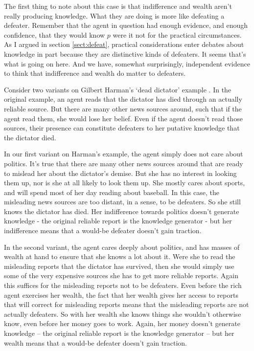 \documentclass[oneside]{book}
\begin{document}
The first thing to note about this case is that indifference and wealth aren't really producing knowledge. What they are doing is more like defeating a defeater. Remember that the agent in question had enough evidence, and enough confidence, that they would know \(p\) were it not for the practical circumstances. As I argued in section \ref{sect:defeat}, practical considerations enter debates about knowledge in part because they are distinctive kinds of defeaters. It seems that's what is going on here. And we have, somewhat surprisingly, independent evidence to think that indifference and wealth do matter to defeaters.

Consider two variants on Gilbert Harman's `dead dictator' example \citep[75]{Harman1973}. In the original example, an agent reads that the dictator has died through an actually reliable source. But there are many other news sources around, such that if the agent read them, she would lose her belief. Even if the agent doesn't read those sources, their presence can constitute defeaters to her putative knowledge that the dictator died.

In our first variant on Harman's example, the agent simply does not care about politics. It's true that there are many other news sources around that are ready to mislead her about the dictator's demise. But she has no interest in looking them up, nor is she at all likely to look them up. She mostly cares about sports, and will spend most of her day reading about baseball. In this case, the misleading news sources are too distant, in a sense, to be defeaters. So she still knows the dictator has died. Her indifference towards politics doesn't generate knowledge - the original reliable report is the knowledge generator - but her indifference means that a would-be defeater doesn't gain traction.

In the second variant, the agent cares deeply about politics, and has masses of wealth at hand to ensure that she knows a lot about it. Were she to read the misleading reports that the dictator has survived, then she would simply use some of the very expensive sources she has to get more reliable reports. Again this suffices for the misleading reports not to be defeaters. Even before the rich agent exercises her wealth, the fact that her wealth gives her access to reports that will correct for misleading reports means that the misleading reports are not actually defeaters. So with her wealth she knows things she wouldn't otherwise know, even before her money goes to work. Again, her money doesn't generate knowledge -- the original reliable report is the knowledge generator -- but her wealth means that a would-be defeater doesn't gain traction.
\end{document}
